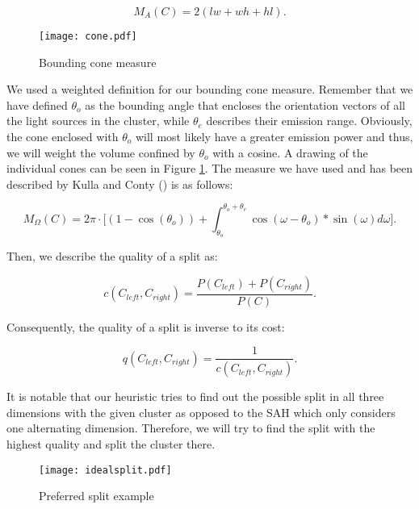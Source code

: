 \begin{equation}
M_A(C) = 2(lw + wh + hl).
\end{equation}

\begin{figure}
	\begin{center}
		\texttt{[image: cone.pdf]}
		\caption{Bounding cone measure}
		\label{fig:cone}
	\end{center}
\end{figure}

We used a weighted definition for our bounding cone measure. Remember that we have defined $\theta_o$ as the bounding angle that encloses the orientation vectors of all the light sources in the cluster, while $\theta_e$ describes their emission range. Obviously, the cone enclosed with $\theta_o$ will most likely have a greater emission power and thus, we will weight the volume confined by $\theta_o$ with a cosine. A drawing of the individual cones can be seen in Figure \ref{fig:cone}. The measure we have used and has been described by Kulla and Conty (\Cite{MLS}) is as follows:

\begin{equation}\label{eq:cone}
M_\Omega(C) = 2\pi \cdot \bigg[(1-\cos(\theta_o)) + \int_{\theta_o}^{\theta_o + \theta_e}\cos(\omega - \theta_o) * \sin(\omega) d \omega\bigg].
\end{equation} 

Then, we describe the quality of a split as:

\begin{equation}
c(C_{left}, C_{right}) = \frac{P(C_{left}) + P(C_{right})}{P(C)}.
\end{equation}

Consequently, the quality of a split is inverse to its cost:

\begin{equation}
q(C_{left}, C_{right}) = \frac{1}{c(C_{left}, C_{right})}.
\end{equation}

It is notable that our heuristic tries to find out the possible split in all three dimensions with the given cluster as opposed to the SAH which only considers one alternating dimension. Therefore, we will try to find the split with the highest quality and split the cluster there.

\begin{figure}
	\begin{center}
		\texttt{[image: idealsplit.pdf]}
		\caption{Preferred split example}
		\label{fig:idealsplit}
	\end{center}
\end{figure}


